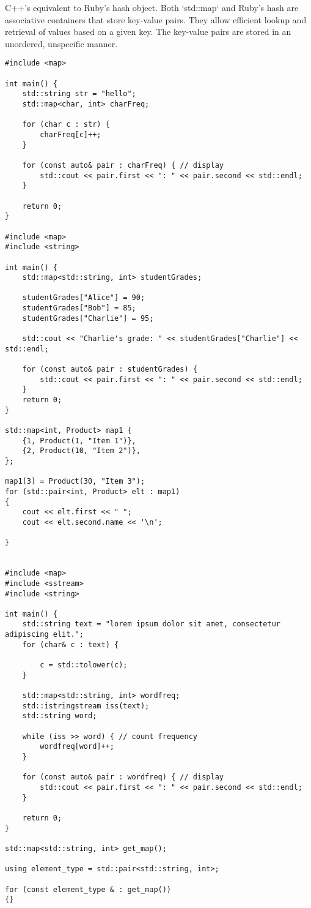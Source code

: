 C++'s equivalent to Ruby's hash object. 
Both `std::map` and Ruby's hash are associative containers that store key-value pairs.
They allow efficient lookup and retrieval of values based on a given key.
The key-value pairs are stored in an unordered, unspecific manner.

\begin{verbatim}
#include <map>

int main() {
    std::string str = "hello";
    std::map<char, int> charFreq;

    for (char c : str) {
        charFreq[c]++;
    }

    for (const auto& pair : charFreq) { // display
        std::cout << pair.first << ": " << pair.second << std::endl;
    }

    return 0;
}

#include <map>
#include <string>

int main() {
    std::map<std::string, int> studentGrades;

    studentGrades["Alice"] = 90;
    studentGrades["Bob"] = 85;
    studentGrades["Charlie"] = 95;

    std::cout << "Charlie's grade: " << studentGrades["Charlie"] << std::endl;

    for (const auto& pair : studentGrades) {
        std::cout << pair.first << ": " << pair.second << std::endl;
    }
    return 0;
}

std::map<int, Product> map1 {
    {1, Product(1, "Item 1")},
    {2, Product(10, "Item 2")},
};

map1[3] = Product(30, "Item 3");
for (std::pair<int, Product> elt : map1)
{
    cout << elt.first << " ";
    cout << elt.second.name << '\n';

}


#include <map>
#include <sstream>
#include <string>

int main() {
    std::string text = "lorem ipsum dolor sit amet, consectetur adipiscing elit.";
    for (char& c : text) {

        c = std::tolower(c);
    }

    std::map<std::string, int> wordfreq;
    std::istringstream iss(text);
    std::string word;

    while (iss >> word) { // count frequency
        wordfreq[word]++;
    }

    for (const auto& pair : wordfreq) { // display
        std::cout << pair.first << ": " << pair.second << std::endl;
    }

    return 0;
}

std::map<std::string, int> get_map();

using element_type = std::pair<std::string, int>;

for (const element_type & : get_map())
{}
\end{verbatim}

